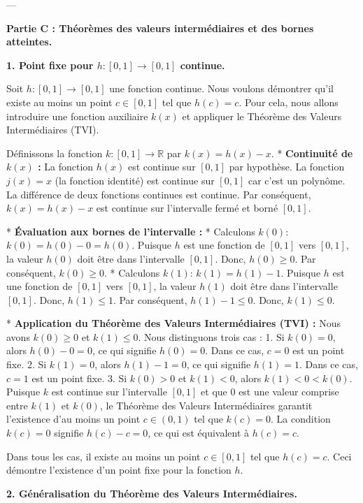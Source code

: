 \documentclass[12pt,a4paper]{report}
\begin{document}
---

\textbf{Partie C : Théorèmes des valeurs intermédiaires et des bornes atteintes.}

\textbf{1. Point fixe pour $h: [0,1] \to [0,1]$ continue.}

Soit $h: [0,1] \to [0,1]$ une fonction continue. Nous voulons démontrer qu'il existe au moins un point $c \in [0,1]$ tel que $h(c) = c$.
Pour cela, nous allons introduire une fonction auxiliaire $k(x)$ et appliquer le Théorème des Valeurs Intermédiaires (TVI).

Définissons la fonction $k: [0,1] \to \mathbb{R}$ par $k(x) = h(x) - x$.
*   \textbf{Continuité de $k(x)$ :} La fonction $h(x)$ est continue sur $[0,1]$ par hypothèse. La fonction $j(x) = x$ (la fonction identité) est continue sur $[0,1]$ car c'est un polynôme. La différence de deux fonctions continues est continue. Par conséquent, $k(x) = h(x) - x$ est continue sur l'intervalle fermé et borné $[0,1]$.

*   \textbf{Évaluation aux bornes de l'intervalle :}
    *   Calculons $k(0)$:
        $k(0) = h(0) - 0 = h(0)$.
        Puisque $h$ est une fonction de $[0,1]$ vers $[0,1]$, la valeur $h(0)$ doit être dans l'intervalle $[0,1]$.
        Donc, $h(0) \ge 0$. Par conséquent, $k(0) \ge 0$.
    *   Calculons $k(1)$:
        $k(1) = h(1) - 1$.
        Puisque $h$ est une fonction de $[0,1]$ vers $[0,1]$, la valeur $h(1)$ doit être dans l'intervalle $[0,1]$.
        Donc, $h(1) \le 1$. Par conséquent, $h(1) - 1 \le 0$. Donc, $k(1) \le 0$.

*   \textbf{Application du Théorème des Valeurs Intermédiaires (TVI) :}
    Nous avons $k(0) \ge 0$ et $k(1) \le 0$.
    Nous distinguons trois cas :
    1.  Si $k(0) = 0$, alors $h(0) - 0 = 0$, ce qui signifie $h(0) = 0$. Dans ce cas, $c=0$ est un point fixe.
    2.  Si $k(1) = 0$, alors $h(1) - 1 = 0$, ce qui signifie $h(1) = 1$. Dans ce cas, $c=1$ est un point fixe.
    3.  Si $k(0) > 0$ et $k(1) < 0$, alors $k(1) < 0 < k(0)$.
        Puisque $k$ est continue sur l'intervalle $[0,1]$ et que $0$ est une valeur comprise entre $k(1)$ et $k(0)$, le Théorème des Valeurs Intermédiaires garantit l'existence d'au moins un point $c \in (0,1)$ tel que $k(c) = 0$.
        La condition $k(c) = 0$ signifie $h(c) - c = 0$, ce qui est équivalent à $h(c) = c$.

Dans tous les cas, il existe au moins un point $c \in [0,1]$ tel que $h(c) = c$.
Ceci démontre l'existence d'un point fixe pour la fonction $h$.

\textbf{2. Généralisation du Théorème des Valeurs Intermédiaires.}
\end{document}
